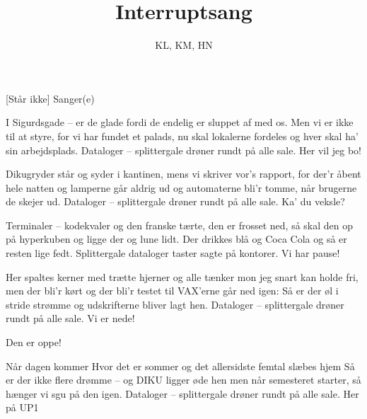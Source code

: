 \documentclass[a4paper,11pt]{article}
\title{Interruptsang}
\author{KL, KM, HN}
\begin{document}
\maketitle

\begin{roles}
[Står ikke] Sanger(e)
\end{roles}


\begin{song}
%
I Sigurdsgade --
er de glade
fordi de endelig er sluppet af med os.
Men vi er ikke til at styre,
for vi har fundet et palads,
nu skal lokalerne fordeles
og hver skal ha' sin arbejdsplads.
Dataloger -- splittergale
drøner rundt på alle sale.
Her vil jeg bo!

Dikugryder
står og syder
i kantinen, mens vi skriver vor's rapport,
for der'r åbent hele natten
og lamperne går aldrig ud
og automaterne bli'r tomme,
når brugerne de skejer ud.
Dataloger -- splittergale
drøner rundt på alle sale.
Ka' du veksle?

Terminaler --
kodekvaler
og den franske tærte, den er frosset ned,
så skal den op på hyperkuben
og ligge der og lune lidt.
Der drikkes blå og Coca Cola
og så er resten lige fedt.
Splittergale dataloger
taster sagte på kontorer.
Vi har pause!

Her spaltes kerner
med trætte hjerner
og alle tænker mon jeg snart kan holde fri,
men der bli'r kørt og der bli'r testet
til VAX'erne går ned igen:
Så er der øl i stride strømme
og udskrifterne bliver lagt hen.
Dataloger -- splittergale
drøner rundt på alle sale.
Vi er nede!


 Den er oppe!

Når dagen kommer
Hvor det er sommer
og det allersidste femtal slæbes hjem
Så er der ikke flere drømme --
og DIKU ligger øde hen
men når semesteret starter,
så hænger vi sgu på den igen.
Dataloger -- splittergale
drøner rundt på alle sale.
Her på UP1
\end{song}
\end{document}
